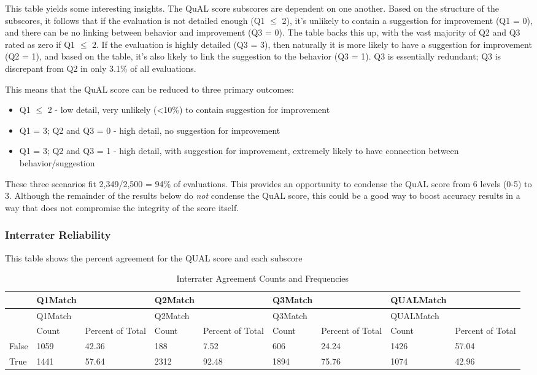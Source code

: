 \documentclass[
  letterpaper,
  DIV=11,
  numbers=noendperiod]{scrartcl}
\providecommand{\tightlist}{%
  \setlength{\itemsep}{0pt}\setlength{\parskip}{0pt}}\usepackage{longtable,booktabs,array}
\begin{document}
This table yields some interesting insights. The QuAL score subscores
are dependent on one another. Based on the structure of the subscores,
it follows that if the evaluation is not detailed enough (Q1 \(\leq\)
2), it's unlikely to contain a suggestion for improvement (Q1 = 0), and
there can be no linking between behavior and improvement (Q3 = 0). The
table backs this up, with the vast majority of Q2 and Q3 rated as zero
if Q1 \(\leq\) 2. If the evaluation is highly detailed (Q3 = 3), then
naturally it is more likely to have a suggestion for improvement (Q2 =
1), and based on the table, it's also likely to link the suggestion to
the behavior (Q3 = 1). Q3 is essentially redundant; Q3 is discrepant
from Q2 in only 3.1\% of all evaluations.

This means that the QuAL score can be reduced to three primary outcomes:

\begin{itemize}
\tightlist
\item
  Q1 \(\leq\) 2 - low detail, very unlikely (\textless10\%) to contain
  suggestion for improvement
\item
  Q1 = 3; Q2 and Q3 = 0 - high detail, no suggestion for improvement
\item
  Q1 = 3; Q2 and Q3 = 1 - high detail, with suggestion for improvement,
  extremely likely to have connection between behavior/suggestion
\end{itemize}

These three scenarios fit 2,349/2,500 = 94\% of evaluations. This
provides an opportunity to condense the QuAL score from 6 levels (0-5)
to 3. Although the remainder of the results below do \emph{not} condense
the QuAL score, this could be a good way to boost accuracy results in a
way that does not compromise the integrity of the score itself.

\hypertarget{interrater-reliability}{%
\subsubsection{Interrater Reliability}\label{interrater-reliability}}

This table shows the percent agreement for the QUAL score and each
subscore

\hypertarget{tbl-percentmatch}{}
\begin{longtable}[]{@{}lllllllll@{}}
\caption{\label{tbl-percentmatch}Interrater Agreement Counts and
Frequencies}\tabularnewline
\toprule()
& Q1Match & & Q2Match & & Q3Match & & QUALMatch & \\
\midrule()
\endfirsthead
\toprule()
& Q1Match & & Q2Match & & Q3Match & & QUALMatch & \\
\midrule()
\endhead
& Count & Percent of Total & Count & Percent of Total & Count & Percent
of Total & Count & Percent of Total \\
False & 1059 & 42.36 & 188 & 7.52 & 606 & 24.24 & 1426 & 57.04 \\
True & 1441 & 57.64 & 2312 & 92.48 & 1894 & 75.76 & 1074 & 42.96 \\
\bottomrule()
\end{longtable}
\end{document}
